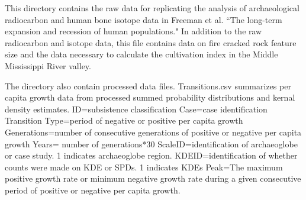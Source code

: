 This directory contains the raw data for replicating the analysis of archaeological radiocarbon and human bone isotope data in Freeman et al. ``The long-term expansion and recession of human populations."
In addition to the raw radiocarbon and isotope data, this file contains data on fire cracked rock feature size and the data necessary to calculate the cultivation index in the Middle Mississippi River valley.

The directory also contain processed data files. Transitions.csv summarizes per capita growth data from processed summed probability distributions and kernal density estimates.
ID=subsistence classification
Case=case identification
Transition Type=period of negative or positive per capita growth
Generations=number of consecutive generations of positive or negative per capita growth
Years= number of generations*30
ScaleID=identification of archaeoglobe or case study. 1 indicates archaeoglobe region.	
KDEID=identification of whether counts were made on KDE or SPDs. 1 indicates KDEs	
Peak=The maximum positive growth rate or minimum negative growth rate during a given consecutive period of positive or negative per capita growth.
